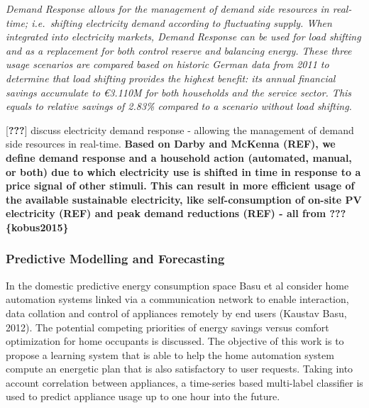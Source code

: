 \documentclass[11pt,]{article}
\begin{document}
\emph{Demand Response allows for the management of demand side resources
in real-time; i.e.~shifting electricity demand according to fluctuating
supply. When integrated into electricity markets, Demand Response can be
used for load shifting and as a replacement for both control reserve and
balancing energy. These three usage scenarios are compared based on
historic German data from 2011 to determine that load shifting provides
the highest benefit: its annual financial savings accumulate to €3.110M
for both households and the service sector. This equals to relative
savings of 2.83\% compared to a scenario without load shifting.}

{[}{\textbf{???}}{]} discuss electricity demand response - allowing the
management of demand side resources in real-time. \textbf{Based on Darby
and McKenna (REF), we define demand response and a household action
(automated, manual, or both) due to which electricity use is shifted in
time in response to a price signal of other stimuli. This can result in
more efficient usage of the available sustainable electricity, like
self-consumption of on-site PV electricity (REF) and peak demand
reductions (REF) - all from \textbf{???}\{kobus2015\}}

\hypertarget{predictive-modelling-and-forecasting}{%
\subsubsection{Predictive Modelling and
Forecasting}\label{predictive-modelling-and-forecasting}}

In the domestic predictive energy consumption space Basu et al consider
home automation systems linked via a communication network to enable
interaction, data collation and control of appliances remotely by end
users (Kaustav Basu, 2012). The potential competing priorities of energy
savings versus comfort optimization for home occupants is discussed. The
objective of this work is to propose a learning system that is able to
help the home automation system compute an energetic plan that is also
satisfactory to user requests. Taking into account correlation between
appliances, a time-series based multi-label classifier is used to
predict appliance usage up to one hour into the future.
\end{document}

